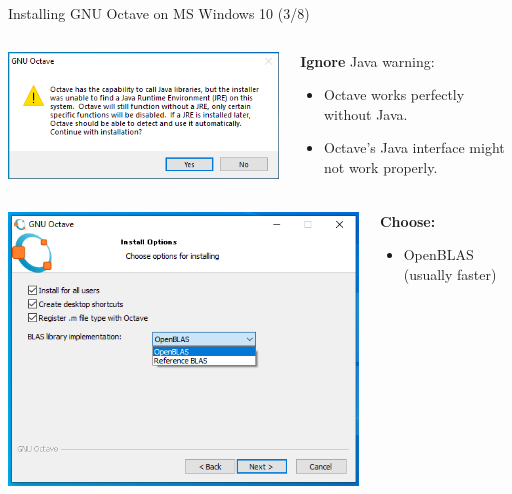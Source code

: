 \begin{frame}{Installing GNU Octave on MS Windows 10 (3/8)}
\begin{columns}
\begin{column}{0.35\textwidth}
\includegraphics[width=\textwidth]{res/ms_windows/win_install_java_warning.png}
\end{column}
\begin{column}{0.5\textwidth}
\textbf{Ignore} Java warning:
\begin{itemize}
\item
Octave works perfectly without Java.

\item
Octave's Java interface might not work properly.
\end{itemize}
\end{column}
\end{columns}
\bigskip
\begin{columns}
\begin{column}{0.35\textwidth}
\includegraphics[width=\textwidth]{res/ms_windows/win_install_blas.png}
\end{column}
\begin{column}{0.5\textwidth}
\textbf{Choose:}
\begin{itemize}
\item
{\color{DarkBlue}OpenBLAS} (usually faster)


\end{itemize}
\end{column}
\end{columns}
\end{frame}
